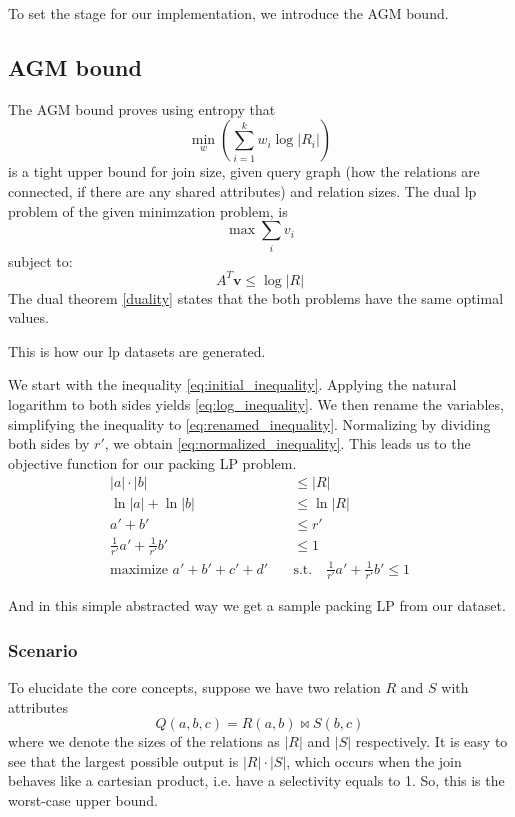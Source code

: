 To set the stage for our implementation, we introduce the AGM bound.

\subsection{AGM bound}
The AGM bound \parencite{atserias2013size} proves
using entropy that \[ \min_w \left( \sum_{i=1}^{k} w_i \log |R_i| \right) \]
is a tight upper bound for join size, given query graph (how the
relations are connected, if there are any shared attributes)
and relation sizes.
The dual \gls{lp} problem of the given minimzation problem, is
\[ \max \sum_{i} v_i \]
subject to:
\[ A^T \mathbf{v} \leq \log |R| \]
The dual theorem \ref{duality} states that the both problems have the same
optimal values.

This is how our \gls{lp} datasets are generated.

We start with the inequality \ref{eq:initial_inequality}. Applying the natural logarithm to both sides yields \ref{eq:log_inequality}. We then rename the variables, simplifying the inequality to \ref{eq:renamed_inequality}.
Normalizing by dividing both sides by \(r'\), we obtain \ref{eq:normalized_inequality}. This leads us to the objective function for our packing LP problem.
\begin{align}
    |a| \cdot |b|                            & \leq |R| \label{eq:initial_inequality}                                                   \\
    \ln|a| + \ln|b|                          & \leq \ln|R| \label{eq:log_inequality}                                                    \\
    a' + b'                                  & \leq r' \label{eq:renamed_inequality}                                                    \\
    \frac{1}{r'} a' + \frac{1}{r'} b'        & \leq 1 \label{eq:normalized_inequality}                                                  \\
    \text{maximize } a' + b' + c' + d' \quad & \text{s.t.} \quad \frac{1}{r'} a' + \frac{1}{r'} b' \leq 1 \label{eq:objective_function}
\end{align}

And in this simple abstracted way we get a sample packing LP from our dataset.

\subsubsection{Scenario}
To elucidate the core concepts,
suppose we have two relation $R$ and $S$ with attributes
\[
    Q(a, b, c) = R(a, b) \Join S(b, c)
\]
where we denote the sizes of the relations as
$|R|$ and $|S|$ respectively.
It is easy to see that the largest possible output is $|R| \cdot |S|$, which occurs when the join
behaves like a cartesian product, i.e. have a selectivity equals to 1. So, this is the worst-case
upper bound.
